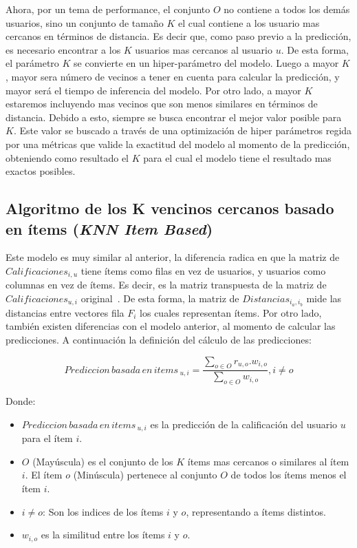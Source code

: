 \documentclass[11pt,a4paper,twoside]{thesis}
\begin{document}
Ahora, por un tema de performance, el conjunto $O$ no contiene a todos los
demás usuarios, sino un conjunto de tamaño $K$ el cual contiene a los usuario
mas cercanos en términos de distancia. Es decir que, como paso previo a la
predicción, es necesario encontrar a los $K$ usuarios mas cercanos al usuario
$u$. De esta forma, el parámetro $K$ se convierte en un hiper-parámetro del
modelo. Luego a mayor $K$, mayor sera número de vecinos a tener en cuenta para
calcular la predicción, y mayor será el tiempo de inferencia del modelo. Por
otro lado, a mayor $K$ estaremos incluyendo mas vecinos que son menos similares
en términos de distancia. Debido a esto, siempre se busca encontrar el mejor
valor posible para $K$. Este valor se buscado a través de una optimización de
hiper parámetros regida por una métricas que valide la exactitud del modelo al
momento de la predicción, obteniendo como resultado el $K$ para el cual el
modelo tiene el resultado mas exactos posibles.

\subsection{Algoritmo de los K vencinos cercanos basado en ítems (\textit{KNN Item Based})}

Este modelo es muy similar al anterior, la diferencia radica en que la matriz
de $Calificaciones_{i, u}$ tiene ítems como filas en vez de usuarios, y
usuarios como columnas en vez de ítems. Es decir, es la matriz transpuesta de
la matriz de $Calificaciones_{u, i}$ original~\cite{useritembasedinference}. De
esta forma, la matriz de $Distancias_{i_a,i_b}$ mide las distancias entre
vectores fila $F_i$ los cuales representan ítems. Por otro lado, también
existen diferencias con el modelo anterior, al momento de calcular las
predicciones. A continuación la definición del cálculo de las predicciones:

\begin{equation}
	Prediccion \mspace{3mu}basada \mspace{3mu}en \mspace{3mu}items\mspace{3mu}_{u, i} = \frac{\sum_{o \in O} r_{u, o}. w_{i, o} }{\sum_{o \in O} w_{i, o} }, i \neq o
\end{equation}
\begin{description}
	\item[Donde:]
\end{description}
\begin{itemize}
	\item $Prediccion \mspace{3mu}basada \mspace{3mu}en \mspace{3mu}items\mspace{3mu}_{u, i}$
	      es la predicción de la calificación del usuario $u$ para el ítem $i$.
	\item $O$ (Mayúscula) es el conjunto de los $K$ ítems mas cercanos o similares
	      al ítem $i$. El ítem $o$ (Minúscula) pertenece al conjunto $O$ de todos
	      los ítems menos el ítem $i$.
	\item $i \neq o$: Son los indices de los ítems $i$ y $o$, representando a ítems distintos.
	\item $w_{i,o}$ es la similitud entre los ítems $i$ y $o$.
\end{itemize}
\end{document}
